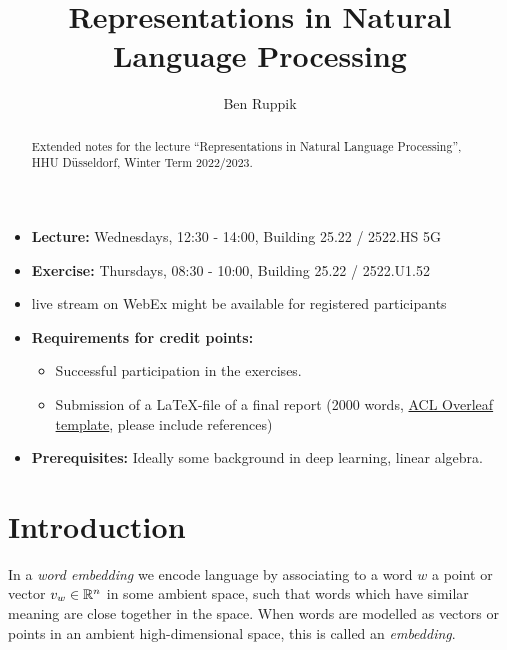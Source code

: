 \documentclass[11pt, a4paper]{amsart}
\title{Representations in Natural Language Processing}
\author{Ben Ruppik}
\begin{document}
\begin{abstract}
    Extended notes for the lecture ``Representations in Natural Language Processing'', HHU D{\"u}sseldorf, Winter Term 2022/2023.
\end{abstract}

\maketitle

\begin{itemize}
    \item \textbf{Lecture:} Wednesdays, 12:30 - 14:00, Building 25.22 / 2522.HS 5G
    \item \textbf{Exercise:} Thursdays, 08:30 - 10:00, Building 25.22 / 2522.U1.52
    \item live stream on WebEx might be available for registered participants
    \item \textbf{Requirements for credit points:}
    \begin{itemize}
        \item Successful participation in the exercises.
        \item Submission of a  \LaTeX-file of a final report (2000 words, \href{https://www.overleaf.com/latex/templates/acl-2020-proceedings-template/zsrkcwjptpcd}{ACL Overleaf template}, please include references) 
    \end{itemize}
    \item \textbf{Prerequisites:}
    Ideally some background in deep learning,
    linear algebra.
\end{itemize}

\clearpage
\section{Introduction}
\label{sec:intro}

In a \emph{word embedding} we encode language by associating to a word $w$ a point or vector $v_{w} \in \mathbb{R}^{n}$ in some ambient space, such that words which have similar meaning are close together in the space.
When words are modelled as vectors or points in an ambient high-dimensional space, this is called an \emph{embedding}.
\end{document}
